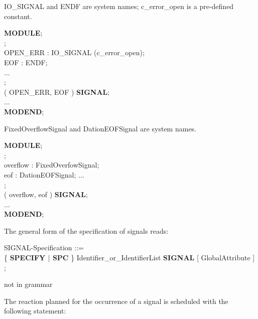 \begin{removed}
IO\_SIGNAL and ENDF are system names; c\_error\_open is a pre-defined
constant.

{\bf MODULE};\\
;\\
\x \x OPEN\_ERR : IO\_SIGNAL (c\_error\_open);\\
\x \x EOF : ENDF;\\
\x \x ...\\
;\\
\x {} ( OPEN\_ERR, EOF ) {\bf SIGNAL};\\
\x \x ... \\
{\bf MODEND};
\end{removed}
\begin{added}
FixedOverflowSignal and DationEOFSignal are system names.

{\bf MODULE};\\
;\\
\x \x overflow : FixedOverfowSignal;\\
\x \x eof : DationEOFSignal;
\x \x ...\\
;\\
\x {} ( overflow, eof ) {\bf SIGNAL};\\
\x \x ... \\
{\bf MODEND};
\end{added}

The general form of the specification of signals reads:

\begin{front}
SIGNAL-Specification ::=\\
\x \{ {\bf SPECIFY  $\mid$  SPC} \} Identifier\_or\_IdentifierList 
{\bf SIGNAL} [ GlobalAttribute ] ;
\end{front}
\begin{grammar}
not in grammar
\end{grammar}

The reaction planned for the occurrence of a signal is scheduled with
the following statement:

